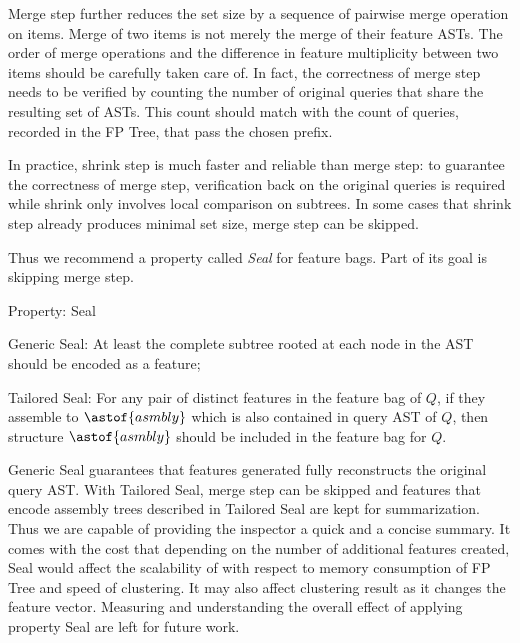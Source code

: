 Merge step further reduces the set size by a sequence of pairwise merge operation on items. Merge of two items is not merely the merge of their feature ASTs. The order of merge operations and the difference in feature multiplicity between two items should be carefully taken care of. In fact, the correctness of merge step needs to be verified by counting the number of original queries that share the resulting set of ASTs. This count should match with the count of queries, recorded in the FP Tree, that pass the chosen prefix.

In practice, shrink step is much faster and reliable than merge step: to guarantee the correctness of merge step, verification back on the original queries is required while shrink only involves local comparison on subtrees. In some cases that shrink step already produces minimal set size, merge step can be skipped.

Thus we recommend a property called \textit{Seal} for feature bags. Part of its goal is skipping merge step.
\begin{definition}
Property: Seal

Generic Seal: At least the complete subtree rooted at each node in the AST should be encoded as a feature; 

Tailored Seal: For any pair of distinct features in the feature bag of $Q$, if they assemble to $\astof{asmbly}$ which is also contained in query AST of $Q$, then structure $\astof{asmbly}$ should be included in the feature bag for $Q$.
\end{definition}
Generic Seal guarantees that features generated fully reconstructs the original query AST. 
With Tailored Seal, merge step can be skipped and features that encode assembly trees described in Tailored Seal are kept for summarization. Thus we are capable of providing the inspector a quick and a concise summary. It comes with the cost that depending on the number of additional features created, Seal would affect the scalability of \sysname{} with respect to memory consumption of FP Tree and speed of clustering. It may also affect clustering result as it changes the feature vector. Measuring and understanding the overall effect of applying property Seal are left for future work.

